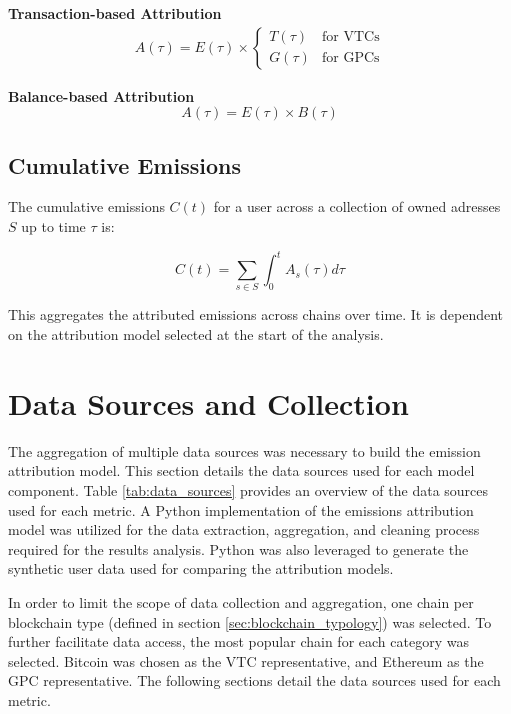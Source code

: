 \documentclass[11pt]{report}
\begin{document}
\textbf{Transaction-based Attribution}
\begin{align}
    A(\tau) = E(\tau) \times \begin{cases}
                                 T(\tau) & \text{for VTCs} \\
                                 G(\tau) & \text{for GPCs}
                             \end{cases}
\end{align}

\textbf{Balance-based Attribution}
\begin{equation}
    A(\tau) = E(\tau) \times B(\tau)
\end{equation}

\subsection*{Cumulative Emissions}

The cumulative emissions $C(t)$ for a user across a collection of owned adresses $S$ up to time $\tau$ is:

\begin{equation}
    C(t) = \sum_{s \in S} \int_{0}^{t} A_s(\tau) d\tau
\end{equation}

This aggregates the attributed emissions across chains over time. It is dependent on the attribution model selected at the start of the analysis.

\section{Data Sources and Collection \label{sec:data_sources}}

The aggregation of multiple data sources was necessary to build the emission attribution model. This section details the data sources used for each model component. Table \ref{tab:data_sources} provides an overview of the data sources used for each metric. A Python implementation of the emissions attribution model was utilized for the data extraction, aggregation, and cleaning process required for the results analysis. Python was also leveraged to generate the synthetic user data used for comparing the attribution models.

In order to limit the scope of data collection and aggregation, one chain per blockchain type (defined in section \ref{sec:blockchain_typology}) was selected. To further facilitate data access, the most popular chain for each category was selected. Bitcoin was chosen as the VTC representative, and Ethereum as the GPC representative. The following sections detail the data sources used for each metric.
\end{document}
